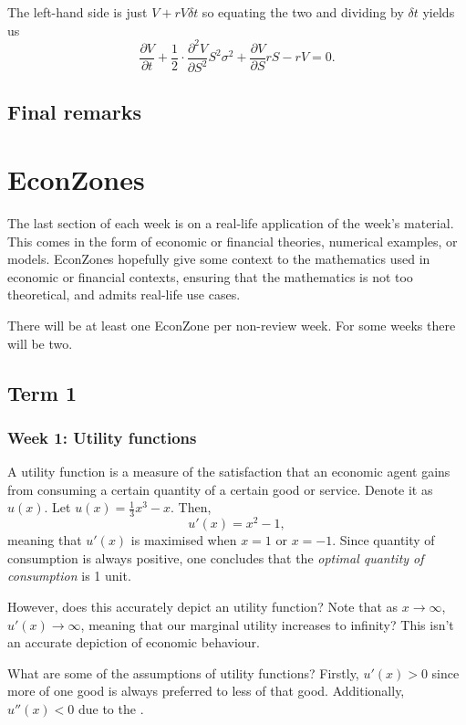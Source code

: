 \documentclass[a4paper, 12pt,oneside,openany]{book}
\begin{document}
The left-hand side is just $V+rV\delta t$ so equating the two and dividing by $\delta t$ yields us $$\frac{\partial V}{\partial t} + \frac{1}{2} \cdot \frac{\partial^2 V}{\partial S^2} S^2\sigma^2 + \frac{\partial V}{\partial S}rS -rV=0.$$

\section{Final remarks}

\chapter{EconZones}

The last section of each week is on a real-life application of the week's material. This comes in the form of economic or financial theories, numerical examples, or models. EconZones hopefully give some context to the mathematics used in economic or financial contexts, ensuring that the mathematics is not too theoretical, and admits real-life use cases. 

There will be at least one EconZone per non-review week. For some weeks there will be two.

\section{Term 1}

\subsection{Week 1: Utility functions}

A utility function is a measure of the satisfaction that an economic agent gains from consuming a certain quantity of a certain good or service. Denote it as $u(x)$. Let $u(x) = \frac{1}{3}x^3-x.$ Then, $$u'(x) = x^2-1,$$ meaning that $u'(x)$ is maximised when $x=1$ or $x=-1$. Since quantity of consumption is always positive, one concludes that the \emph{optimal quantity of consumption} is 1 unit. 

However, does this accurately depict an utility function? Note that as $x \to \infty$, $u'(x) \to \infty$, meaning that our marginal utility increases to infinity? This isn't an accurate depiction of economic behaviour.

What are some of the assumptions of utility functions? Firstly, $u'(x) >0$ since more of one good is always preferred to less of that good. Additionally, $u''(x) <0$ due to the .
\end{document}
